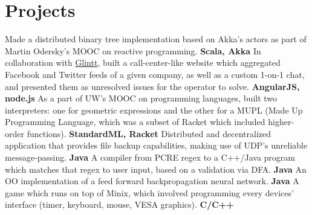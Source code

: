 \documentclass[11pt,a4paper]{moderncv}
\begin{document}
\section{Projects}
{Made a distributed binary tree implementation based on Akka's actors as part of Martin Odersky's MOOC on reactive programming. \textbf{Scala, Akka}}
{In collaboration with \href{http://www.glintt.com/}{Glintt}, built a call-center-like website which aggregated Facebook and Twitter feeds of a given company, as well as a custom 1-on-1 chat, and presented them as unresolved issues for the operator to solve.  \textbf{AngularJS, node.js}}
{As a part of UW's MOOC on programming languages, built two interpreters: one for geometric expressions and the other for a MUPL (Made Up Programming Language, which was a subset of Racket which included higher-order functions). \textbf{StandardML, Racket}}
{Distributed and decentralized application that provides file backup capabilities, making use of UDP's unreliable message-passing. \textbf{Java}}
{A compiler from PCRE regex to a C++/Java program which matches that regex to user input, based on a validation via DFA. \textbf{Java}}
{An OO implementation of a feed forward backpropagation neural network. \textbf{Java}}
{A game which runs on top of Minix, which involved programming every devices' interface (timer, keyboard, mouse, VESA graphics). \textbf{C/C++}}

\end{document}
